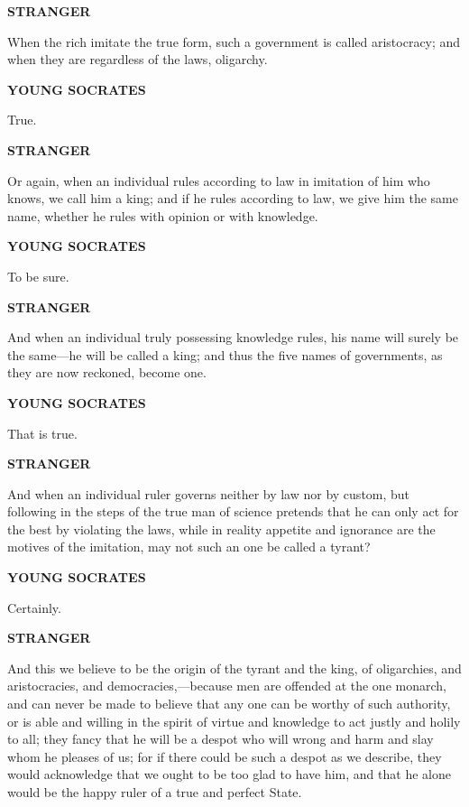 \documentclass[11pt,letter]{article}
\begin{document}
\par \textbf{STRANGER}
\par   When the rich imitate the true form, such a government is called aristocracy; and when they are regardless of the laws, oligarchy.

\par \textbf{YOUNG SOCRATES}
\par   True.

\par \textbf{STRANGER}
\par   Or again, when an individual rules according to law in imitation of him who knows, we call him a king; and if he rules according to law, we give him the same name, whether he rules with opinion or with knowledge.

\par \textbf{YOUNG SOCRATES}
\par   To be sure.

\par \textbf{STRANGER}
\par   And when an individual truly possessing knowledge rules, his name will surely be the same—he will be called a king; and thus the five names of governments, as they are now reckoned, become one.

\par \textbf{YOUNG SOCRATES}
\par   That is true.

\par \textbf{STRANGER}
\par   And when an individual ruler governs neither by law nor by custom, but following in the steps of the true man of science pretends that he can only act for the best by violating the laws, while in reality appetite and ignorance are the motives of the imitation, may not such an one be called a tyrant?

\par \textbf{YOUNG SOCRATES}
\par   Certainly.

\par \textbf{STRANGER}
\par   And this we believe to be the origin of the tyrant and the king, of oligarchies, and aristocracies, and democracies,—because men are offended at the one monarch, and can never be made to believe that any one can be worthy of such authority, or is able and willing in the spirit of virtue and knowledge to act justly and holily to all; they fancy that he will be a despot who will wrong and harm and slay whom he pleases of us; for if there could be such a despot as we describe, they would acknowledge that we ought to be too glad to have him, and that he alone would be the happy ruler of a true and perfect State.
\end{document}
